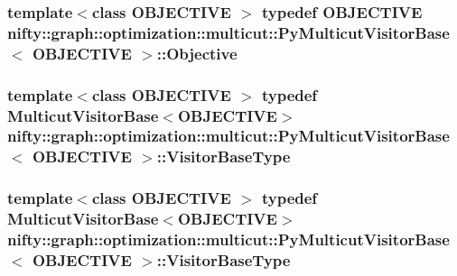 \subsubsection[{Objective}]{\setlength{\rightskip}{0pt plus 5cm}template$<$class O\+B\+J\+E\+C\+T\+I\+V\+E $>$ typedef O\+B\+J\+E\+C\+T\+I\+V\+E {\bf nifty\+::graph\+::optimization\+::multicut\+::\+Py\+Multicut\+Visitor\+Base}$<$ O\+B\+J\+E\+C\+T\+I\+V\+E $>$\+::{\bf Objective}}\label{classnifty_1_1graph_1_1optimization_1_1multicut_1_1PyMulticutVisitorBase_abb6bb7370d72d0a22f2235789634e592}
\hypertarget{classnifty_1_1graph_1_1optimization_1_1multicut_1_1PyMulticutVisitorBase_ae436994b1c4379009dac9fd8e8935709}{}
\subsubsection[{Visitor\+Base\+Type}]{\setlength{\rightskip}{0pt plus 5cm}template$<$class O\+B\+J\+E\+C\+T\+I\+V\+E $>$ typedef {\bf Multicut\+Visitor\+Base}$<$O\+B\+J\+E\+C\+T\+I\+V\+E$>$ {\bf nifty\+::graph\+::optimization\+::multicut\+::\+Py\+Multicut\+Visitor\+Base}$<$ O\+B\+J\+E\+C\+T\+I\+V\+E $>$\+::{\bf Visitor\+Base\+Type}}\label{classnifty_1_1graph_1_1optimization_1_1multicut_1_1PyMulticutVisitorBase_ae436994b1c4379009dac9fd8e8935709}
\hypertarget{classnifty_1_1graph_1_1optimization_1_1multicut_1_1PyMulticutVisitorBase_ae436994b1c4379009dac9fd8e8935709}{}
\subsubsection[{Visitor\+Base\+Type}]{\setlength{\rightskip}{0pt plus 5cm}template$<$class O\+B\+J\+E\+C\+T\+I\+V\+E $>$ typedef {\bf Multicut\+Visitor\+Base}$<$O\+B\+J\+E\+C\+T\+I\+V\+E$>$ {\bf nifty\+::graph\+::optimization\+::multicut\+::\+Py\+Multicut\+Visitor\+Base}$<$ O\+B\+J\+E\+C\+T\+I\+V\+E $>$\+::{\bf Visitor\+Base\+Type}}\label{classnifty_1_1graph_1_1optimization_1_1multicut_1_1PyMulticutVisitorBase_ae436994b1c4379009dac9fd8e8935709}


